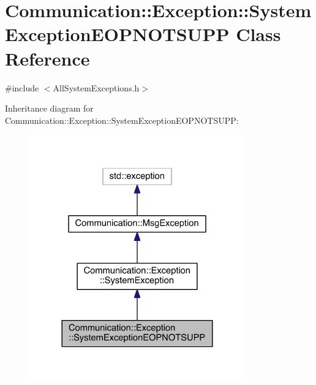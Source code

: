 \hypertarget{class_communication_1_1_exception_1_1_system_exception_e_o_p_n_o_t_s_u_p_p}{}\section{Communication\+:\+:Exception\+:\+:System\+Exception\+E\+O\+P\+N\+O\+T\+S\+U\+P\+P Class Reference}
\label{class_communication_1_1_exception_1_1_system_exception_e_o_p_n_o_t_s_u_p_p}


{\ttfamily \#include $<$All\+System\+Exceptions.\+h$>$}



Inheritance diagram for Communication\+:\+:Exception\+:\+:System\+Exception\+E\+O\+P\+N\+O\+T\+S\+U\+P\+P\+:\nopagebreak
\begin{figure}[H]
\begin{center}
\leavevmode
\includegraphics[width=264pt]{class_communication_1_1_exception_1_1_system_exception_e_o_p_n_o_t_s_u_p_p__inherit__graph}
\end{center}
\end{figure}


